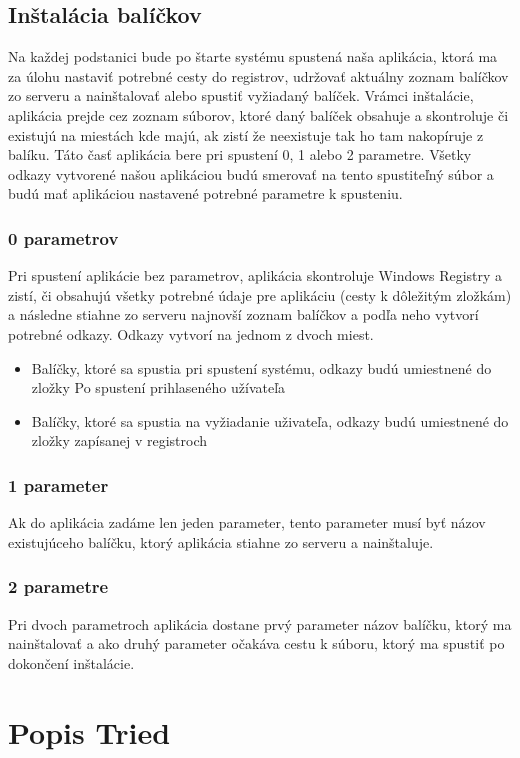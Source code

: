 \subsection{Inštalácia balíčkov}
Na každej podstanici bude po štarte systému spustená naša aplikácia, ktorá ma za úlohu nastaviť potrebné cesty do registrov, udržovať aktuálny zoznam balíčkov zo serveru a nainštalovať alebo spustiť vyžiadaný balíček. Vrámci inštalácie, aplikácia prejde cez zoznam súborov, ktoré daný balíček obsahuje a skontroluje či existujú na miestách kde majú, ak zistí že neexistuje tak ho tam nakopíruje z balíku. Táto časť aplikácia bere pri spustení 0, 1 alebo 2 parametre. Všetky odkazy vytvorené našou aplikáciou budú smerovať na tento spustiteľný súbor a budú mať aplikáciou nastavené potrebné parametre k spusteniu.

\subsubsection{0 parametrov}
Pri spustení aplikácie bez parametrov, aplikácia skontroluje Windows Registry a zistí, či obsahujú všetky potrebné údaje pre aplikáciu (cesty k dôležitým zložkám) a následne stiahne zo serveru najnovší zoznam balíčkov a podľa neho vytvorí potrebné odkazy. Odkazy vytvorí na jednom z dvoch miest.
\begin{itemize}
\item Balíčky, ktoré sa spustia pri spustení systému, odkazy budú umiestnené do zložky Po spustení prihlaseného užívateľa
\item Balíčky, ktoré sa spustia na vyžiadanie uživateľa, odkazy budú umiestnené do zložky zapísanej v registroch
\end{itemize}

\subsubsection{1 parameter}
Ak do aplikácia zadáme len jeden parameter, tento parameter musí byť názov existujúceho balíčku, ktorý aplikácia stiahne zo serveru a nainštaluje.

\subsubsection{2 parametre}
Pri dvoch parametroch aplikácia dostane prvý parameter názov balíčku, ktorý ma nainštalovať a ako druhý parameter očakáva cestu k súboru, ktorý ma spustiť po dokončení inštalácie.

\section{Popis Tried}

